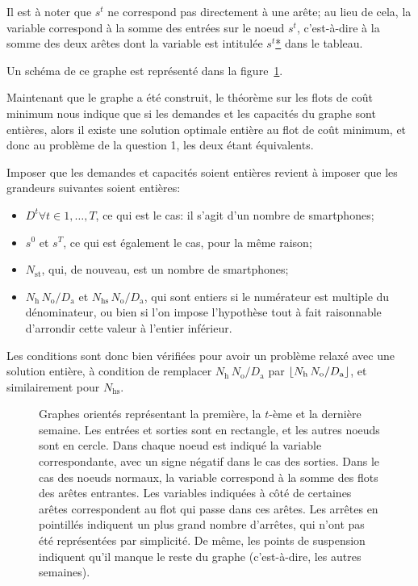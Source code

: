 Il est à noter que $s^t$ ne correspond pas directement à une arête; au lieu de cela, la variable correspond à la somme des entrées sur le noeud $s^t$, c'est-à-dire à la somme des deux arêtes dont la variable est intitulée \og{}$s^t$\;\underline{*}\fg{} dans le tableau.

Un schéma de ce graphe est représenté dans la figure~\ref{fig:q2_flow}.

Maintenant que le graphe a été construit, le théorème sur les flots de coût minimum nous indique que si les demandes et les capacités du graphe sont entières, alors il existe une solution optimale entière au flot de coût minimum, et donc au problème de la question 1, les deux étant équivalents.

Imposer que les demandes et capacités soient entières revient à imposer que les grandeurs suivantes soient entières:
\begin{itemize}
    \item $D^t \forall t \in 1,\dots,T$, ce qui est le cas: il s'agit d'un nombre de smartphones;
    \item $s^0$ et $s^T$, ce qui est également le cas, pour la même raison;
    \item $N_\mathrm{st}$, qui, de nouveau, est un nombre de smartphones;
    \item $N_\mathrm{h}\,N_\mathrm{o}/D_\mathrm{a}$ et $N_\mathrm{hs}\,N_\mathrm{o}/D_\mathrm{a}$, qui sont entiers si le numérateur est multiple du dénominateur, ou bien si l'on impose l'hypothèse tout à fait raisonnable d'arrondir cette valeur à l'entier inférieur.
\end{itemize}

Les conditions sont donc bien vérifiées pour avoir un problème relaxé avec une solution entière, à condition de remplacer $N_\mathrm{h}\,N_\mathrm{o}/D_\mathrm{a}$ par $\lfloor N_\mathrm{h}\,N_\mathrm{o}/D_\mathrm{a}\rfloor$, et similairement pour $N_\mathrm{hs}$.

\begin{figure}[H]
    \centering
    \caption{Graphes orientés représentant la première, la $t$-ème et la dernière semaine. Les entrées et sorties sont en rectangle, et les autres noeuds sont en cercle. Dans chaque noeud est indiqué la variable correspondante, avec un signe négatif dans le cas des sorties. Dans le cas des noeuds normaux, la variable correspond à la somme des flots des arêtes entrantes. Les variables indiquées à côté de certaines arêtes correspondent au flot qui passe dans ces arêtes. Les arrêtes en pointillés indiquent un plus grand nombre d'arrêtes, qui n'ont pas été représentées par simplicité. De même, les points de suspension indiquent qu'il manque le reste du graphe (c'est-à-dire, les autres semaines).}
    \label{fig:q2_flow}
\end{figure}
